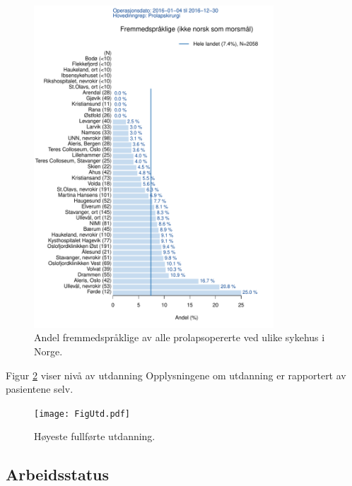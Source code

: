 \documentclass [norsk,a4paper,twoside]{article}\usepackage[]{graphicx}\usepackage[]{color}
\begin{document}
\begin{figure}[ht]
	\centering \includegraphics[width= 0.8\textwidth]{FigMorsmal.pdf}
	\caption{\label{fig:Morsmal} Andel fremmedspråklige av alle prolapsopererte ved ulike sykehus i
Norge.}
\end{figure}




Figur \ref{fig:Utd} viser nivå av utdanning 
Opplysningene om utdanning er rapportert av pasientene selv.

\begin{figure}[ht]
	\centering \texttt{[image: FigUtd.pdf]}
	\caption{\label{fig:Utd} Høyeste fullførte utdanning.}
\end{figure}




\subsection{Arbeidsstatus}
\end{document}
